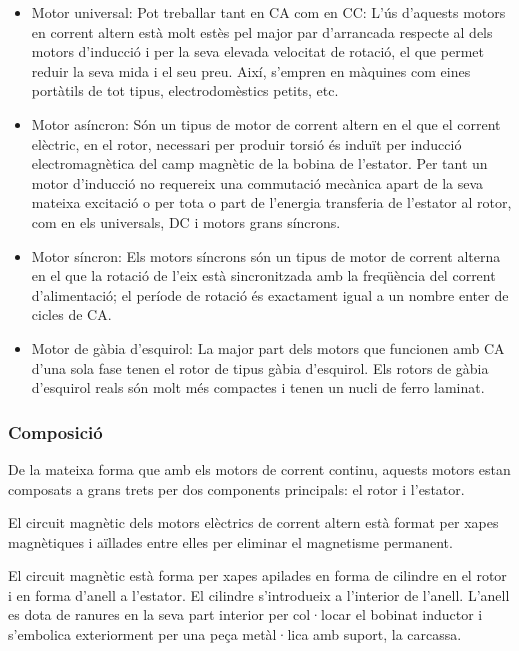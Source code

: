 \begin{itemize}
    \item Motor universal: Pot treballar tant en CA com en CC: L'ús d'aquests motors en corrent altern està molt estès pel major par d'arrancada respecte al dels motors d'inducció i per la seva elevada velocitat de rotació, el que permet reduir la seva mida i el seu preu. Així, s'empren en màquines com eines portàtils de tot tipus, \newline electrodomèstics petits, etc.
    \item Motor asíncron: Són un tipus de motor de corrent altern en el que el corrent elèctric, en el rotor, necessari per produir torsió és induït per inducció electromagnètica del camp magnètic de la bobina de l'estator. Per tant un motor d'inducció no requereix una commutació mecànica apart de la seva mateixa excitació o per tota o part de l'energia transferia de l'estator al rotor, com en els universals, DC i motors grans síncrons.
    \item Motor síncron: Els motors síncrons són un tipus de motor de corrent alterna en el que la rotació de l'eix està sincronitzada amb la freqüència del corrent d'alimentació; el període de rotació és exactament igual a un nombre enter de cicles de CA.
    \item Motor de gàbia d'esquirol: La major part dels motors que funcionen amb CA d'una sola fase tenen el rotor de tipus gàbia d'esquirol. Els rotors de gàbia d'esquirol reals són molt més compactes i tenen un nucli de ferro laminat.
\end{itemize}

\subsubsection{Composició}

De la mateixa forma que amb els motors de corrent continu, aquests motors estan composats a grans trets per dos components principals: el rotor i l'estator. 

El circuit magnètic dels motors elèctrics de corrent altern està format per xapes magnètiques i aïllades entre elles per eliminar el magnetisme permanent.

El circuit magnètic està forma per xapes apilades en forma de cilindre en el rotor i en forma d'anell a l'estator. El cilindre s'introdueix a l'interior de l'anell. L'anell es dota de ranures en la seva part interior per col·locar el bobinat inductor i s'embolica exteriorment per una peça metàl·lica amb suport, la carcassa.

